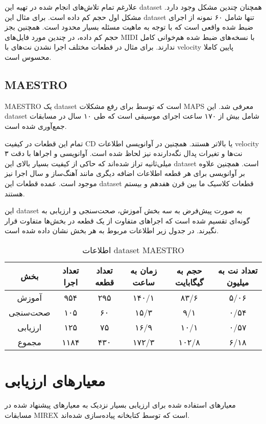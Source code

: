 علارغم تمام تلاش‌های انجام شده در تهیه این \gls{dataset} همچنان چندین مشکل وجود
دارد. مشکل اول حجم کم داده است. برای مثال این \gls{dataset} تنها شامل ۶۰ نمونه
از اجرای ضبط شده واقعی است که با توجه به ماهیت مسئله بسیار محدود است. همچنین بجز
حجم کم داده، در چندین مورد فایل‌های \gls{MIDI} با نسخه‌های ضبط شده هم‌خوانی کامل
ندارند. برای مثال در قطعات مختلف اجرا نشدن نت‌های با \gls{velocity} پایین کاملا
محسوس است.

\subsection{MAESTRO}
MAESTRO یک \gls{dataset} است که توسط \cite{hawthorne2018enabling} برای رفع
مشکلات MAPS معرفی شد. این \gls{dataset} شامل بیش از ۱۷۰ ساعت اجرای موسیقی است که
طی ۱۰ سال در مسابقات  جمع‌آوری شده است.

تمام این قطعات در کیفیت CD یا بالاتر هستند. همچنین در آوانویسی اطلاعات
\gls{velocity} نت‌ها و تغیرات پدال نگه‌دارنده نیز لحاظ شده است. آوانویسی و
اجراها با دقت ۳ میلی‌ثانیه تراز شده‌اند که حاکی از کیفیت بسیار بالای این
\gls{dataset} است. همچنین علاوه بر آوانویسی برای هر قطعه اطلاعات اضافه‌ دیگری
مانند آهنگ‌ساز و سال اجرا نیز موجود است. عمده قطعات این \gls{dataset} قطعات
کلاسیک ما بین قرن هفدهم و بیستم هستند.

این \gls{dataset} به صورت پیش‌فرض به سه بخش آموزش، صحت‌سنجی و ارزیابی به گونه‌ای
تقسیم شده است که اجراهای متفاوت از یک قطعه در بخش‌ها متفاوت قرار نگیرند. در جدول
زیر اطلاعات مربوط به هر بخش نشان داده شده است.
\begin{table}[ht]
    \centering
    \begin{tabular}{|c|c|c|c|c|c|}
        \hline
        بخش & تعداد اجرا & تعداد قطعه & زمان به ساعت & حجم به گیگابایت & تعداد نت به میلیون \\
        \hline
        آموزش & ۹۵۴ & ۲۹۵ & ۱۴۰/۱ & ۸۳/۶ & ۵/۰۶ \\
        \hline
        صحت‌سنجی & ۱۰۵ & ۶۰ & ۱۵/۳ & ۹/۱ & ۰/۵۴ \\
        \hline
        ارزیابی & ۱۲۵ & ۷۵ & ۱۶/۹ & ۱۰/۱ & ۰/۵۷ \\
        \hline
        مجموع & ۱۱۸۴ & ۴۳۰ & ۱۷۲/۳ & ۱۰۲/۸ & ۶/۱۸ \\
        \hline
    \end{tabular}
    \caption{اطلاعات \gls{dataset} MAESTRO}
\end{table}

\section{معیارهای ارزیابی}
معیارهای استفاده شده برای ارزیابی بسیار نزدیک به معیارهای پیشنهاد شده در مسابقات
MIREX است که توسط کتابخانه  \cite{raffel2014mir_eval} پیاده‌سازی
شده‌اند.

